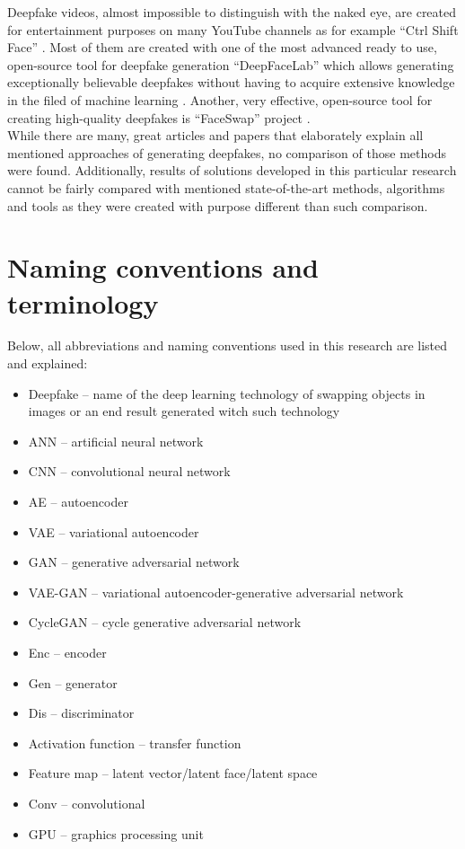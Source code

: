 Deepfake videos, almost impossible to distinguish with the naked eye, are created for entertainment purposes on many YouTube channels as for example ``Ctrl Shift Face'' \cite{ctrl_shift_face_bib}. Most of them are created with one of the most advanced ready to use, open-source tool for deepfake generation ``DeepFaceLab'' which allows generating exceptionally believable deepfakes without having to acquire extensive knowledge in the filed of machine learning \cite{DeepFaceLab_bib}. Another, very effective, open-source tool for creating high-quality deepfakes is ``FaceSwap'' project \cite{faceswap_bib}.\\

While there are many, great articles and papers that elaborately explain all mentioned approaches of generating deepfakes, no comparison of those methods were found. Additionally, results of solutions developed in this particular research cannot be fairly compared with mentioned state-of-the-art methods, algorithms and tools as they were created with purpose different than such comparison.

\section{Naming conventions and terminology}
Below, all abbreviations and naming conventions used in this research are listed and explained:

\begin{itemize}
\item Deepfake -- name of the deep learning technology of swapping objects in images or an end result generated witch such technology
\item ANN -- artificial neural network
\item CNN -- convolutional neural network
\item AE -- autoencoder
\item VAE -- variational autoencoder
\item GAN -- generative adversarial network
\item VAE-GAN -- variational autoencoder-generative adversarial network
\item CycleGAN -- cycle generative adversarial network
\item Enc -- encoder
\item Gen -- generator
\item Dis -- discriminator
\item Activation function -- transfer function
\item Feature map -- latent vector/latent face/latent space
\item Conv -- convolutional
\item GPU -- graphics processing unit
\end{itemize}